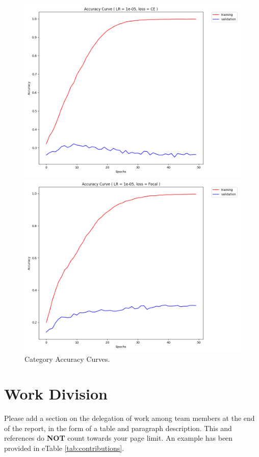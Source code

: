 \documentclass[10pt,twocolumn,letterpaper]{article}
\begin{document}
\begin{figure}
\begin{subfigure}
    \begin{left}
    \includegraphics[width=0.45\linewidth]{lr_1e-05_e50_CE_accuracy_history}
    \end{left}
\end{subfigure}%
\begin{subfigure}
    \begin{right}
    \includegraphics[width=0.45\linewidth]{lr_1e-05_e50_Focal_accuracy_history}
    \end{right}
\end{subfigure}%
  \caption{Category Accuracy Curves.}
\label{fig:loss_curve}
\end{figure}





\section{Work Division}

Please add a section on the delegation of work among team members at the end of the report, in the form of a table and paragraph description. This and references do \textbf{NOT} count towards your page limit. An example has been provided in eTable \ref{tab:contributions}.
\end{document}
